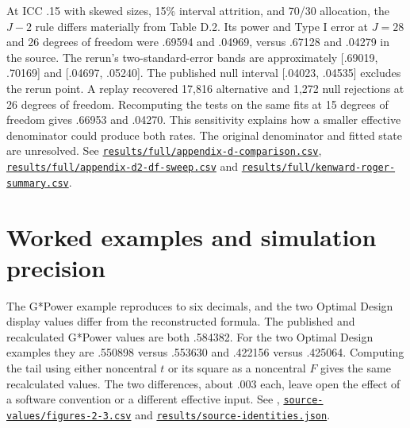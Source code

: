 At ICC .15 with skewed sizes, 15\% interval attrition, and 70/30 allocation, the $J-2$ rule differs materially from Table D.2. Its power and Type I error at $J=28$ and 26 degrees of freedom were .69594 and .04969, versus .67128 and .04279 in the source. The rerun's two-standard-error bands are approximately [.69019, .70169] and [.04697, .05240]. The published null interval [.04023, .04535] excludes the rerun point. A replay recovered 17,816 alternative and 1,272 null rejections at 26 degrees of freedom. Recomputing the tests on the same fits at 15 degrees of freedom gives .66953 and .04270. This sensitivity explains how a smaller effective denominator could produce both rates. The original denominator and fitted state are unresolved. See \href{https://github.com/alectionary/vibe-math/blob/master/formalization/kupzyk-power-assumptions/results/full/appendix-d-comparison.csv}{\nolinkurl{results/full/appendix-d-comparison.csv}}, \href{https://github.com/alectionary/vibe-math/blob/master/formalization/kupzyk-power-assumptions/results/full/appendix-d2-df-sweep.csv}{\nolinkurl{results/full/appendix-d2-df-sweep.csv}} and \href{https://github.com/alectionary/vibe-math/blob/master/formalization/kupzyk-power-assumptions/results/full/kenward-roger-summary.csv}{\nolinkurl{results/full/kenward-roger-summary.csv}}.
\label{dis:appendix-d2-od}

\section{Worked examples and simulation precision}\label{sec:examples}
The G*Power example reproduces to six decimals, and the two Optimal Design display values differ from the reconstructed formula. The published and recalculated G*Power values are both .584382. For the two Optimal Design examples they are .550898 versus .553630 and .422156 versus .425064. Computing the tail using either noncentral $t$ or its square as a noncentral $F$ gives the same recalculated values. The two differences, about .003 each, leave open the effect of a software convention or a different effective input. See \citet[Figures 1--3]{kupzyk2011}, \href{https://github.com/alectionary/vibe-math/blob/master/formalization/kupzyk-power-assumptions/source-values/figures-2-3.csv}{\nolinkurl{source-values/figures-2-3.csv}} and \href{https://github.com/alectionary/vibe-math/blob/master/formalization/kupzyk-power-assumptions/results/source-identities.json}{\nolinkurl{results/source-identities.json}}.
\label{dis:od-screen-example}

